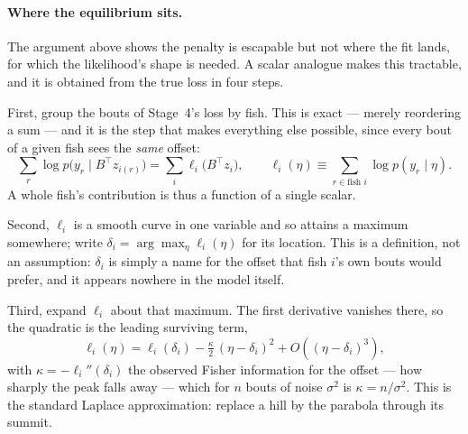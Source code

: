 \paragraph{Where the equilibrium sits.} The argument above shows the penalty is
escapable but not where the fit lands, for which the likelihood's shape is
needed. A scalar analogue makes this tractable, and it is obtained from the true
loss in four steps.

First, group the bouts of Stage~4's loss by fish. This is exact --- merely
reordering a sum --- and it is the step that makes everything else possible,
since every bout of a given fish sees the \emph{same} offset:
\begin{equation}
\sum_{r}\log p\bigl(y_r\mid B^{\top}z_{i(r)}\bigr)
=\sum_{i}\ell_i\bigl(B^{\top}z_i\bigr),
\qquad
\ell_i(\eta)\equiv\!\!\sum_{r\in\text{fish }i}\!\!\log p(y_r\mid\eta).
\end{equation}
A whole fish's contribution is thus a function of a single scalar.

Second, $\ell_i$ is a smooth curve in one variable and so attains a maximum
somewhere; write $\delta_i=\arg\max_\eta \ell_i(\eta)$ for its location. This is
a definition, not an assumption: $\delta_i$ is simply a name for the offset that
fish $i$'s own bouts would prefer, and it appears nowhere in the model itself.

Third, expand $\ell_i$ about that maximum. The first derivative vanishes there,
so the quadratic is the leading surviving term,
\begin{equation}
\ell_i(\eta)=\ell_i(\delta_i)-\tfrac{\kappa}{2}\,(\eta-\delta_i)^{2}
+O\!\left((\eta-\delta_i)^{3}\right),
\end{equation}
with $\kappa=-\ell_i''(\delta_i)$ the observed Fisher information for the
offset --- how sharply the peak falls away --- which for $n$ bouts of noise
$\sigma^2$ is $\kappa=n/\sigma^{2}$. This is the standard Laplace
approximation: replace a hill by the parabola through its summit.

